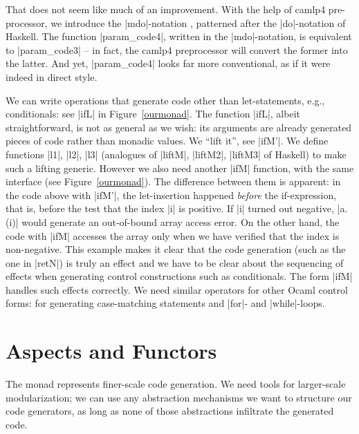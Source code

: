 \documentclass{llncs}
\begin{document}
That does not seem like much of an improvement. With the help of
camlp4 pre-processor, we introduce the |mdo|-notation \cite{metamonadsURL},
patterned after the |do|-notation of Haskell. The function
|param_code4|, written in the |mdo|-notation, is equivalent to
|param_code3| -- in fact, the camlp4 preprocessor will convert the
former into the latter. And yet, |param_code4| looks far more
conventional, as if it were indeed in direct style.

We can write operations that generate code other than let-statements,
e.g., conditionals: see |ifL| in Figure~\ref{ourmonad}. The function |ifL|, 
albeit straightforward, is not as general as we wish: its arguments are
already generated pieces of code rather than monadic values. We
``lift it'', see |ifM'|. We define functions |l1|,
|l2|, |l3| (analogues of |liftM|, |liftM2|, |liftM3| of Haskell) 
to make such a lifting generic. However we also need
another |ifM| function, with the same
interface (see Figure~\ref{ourmonad}). The difference between them is
apparent: in the code above with |ifM'|, the let-insertion
happened \emph{before} the if-expression, that is, before the test that
the index |i| is positive. If |i| turned out
negative, |a.(i)| would generate an out-of-bound array access
error. On the other hand, the code with |ifM| accesses the array only
when we have verified that the index is non-negative. This example
makes it clear that the code generation (such as the one in |retN|) is 
truly an effect and we have to be clear about the sequencing of
effects when generating control constructions such as conditionals.
The form |ifM| handles such effects correctly. We
need similar operators for other Ocaml control forms: for generating
case-matching statements and |for|- and |while|-loops.

\section{Aspects and Functors}\label{functors}

The monad represents finer-scale code generation. We need tools for
larger-scale modularization; we can use any abstraction
mechanisms we want to structure our code generators, as long as none
of those abstractions infiltrate the generated code.
\end{document}
